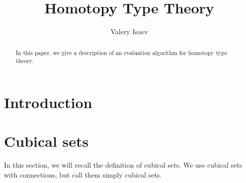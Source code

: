 \documentclass{amsart}
\theoremstyle{definition}
\theoremstyle{remark}
\numberwithin{table}{section}
\begin{document}
\title{Homotopy Type Theory}

\author{Valery Isaev}

\begin{abstract}
In this paper, we give a description of an evaluation algorithm for homotopy type theory.
\end{abstract}

\maketitle

\section{Introduction}

\section{Cubical sets}

In this section, we will recall the definition of cubical sets.
We use cubical sets with connections, but call them simply cubical sets.
\end{document}
